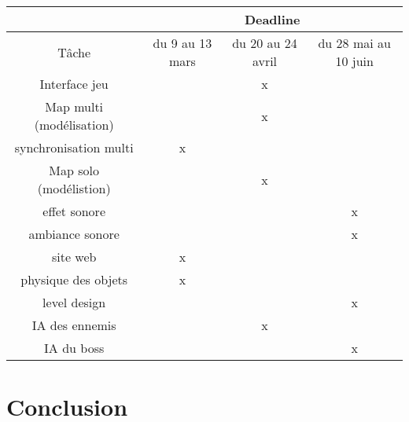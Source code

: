 \documentclass[12pt]{report}
\begin{document}
	\begin{tabular}{|*{4}{c|}}
	\hline
	& \multicolumn{3}{|c|}{Deadline}\\
	\hline
	Tâche & du 9 au 13 mars & du 20 au 24 avril & du 28 mai au 10 juin \\
	\hline
	Interface jeu & & x & \\
	\hline
	Map multi (modélisation) & & x & \\
	\hline
	synchronisation multi & x & & \\
	\hline
	Map solo (modélistion) & & x & \\
	\hline
	effet sonore & & & x \\
	\hline
	ambiance sonore & & & x \\
	\hline
	site web & x & & \\
	\hline 
	physique des objets & x & & \\
	\hline 
	level design & & & x \\
	\hline 
	IA des ennemis & & x & \\
	\hline
	IA du boss & & & x \\
	\hline
	
	\end{tabular}
\section{Conclusion}
\end{document}
